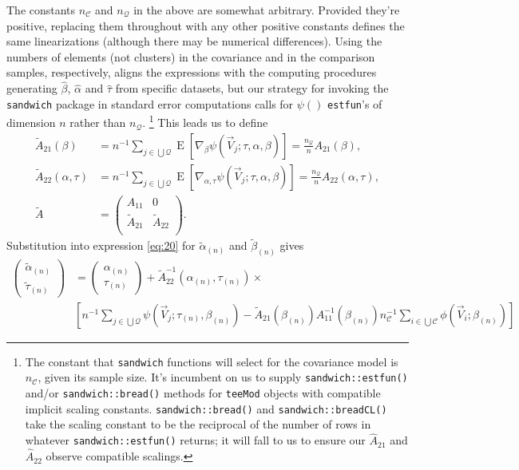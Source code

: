 \documentclass{article}
\newcommand{\EE}{\operatorname{E}}
\begin{document}
The constants $n_{\mathcal{C}}$ and
$n_{\mathcal{Q}}$ in the above are somewhat
arbitrary.  Provided they're positive, replacing them throughout with any other
positive constants defines the same linearizations (although there may
be numerical differences).  
Using the numbers of elements (not
clusters) in the covariance and in the comparison samples,
respectively, aligns the expressions with the computing procedures
generating $\hat\beta$, $\hat\alpha$ and $\hat\tau$ from specific
datasets, but our strategy for invoking the \texttt{sandwich} package
in standard error computations calls for  $\psi()$ \texttt{estfun}'s
of dimension $n$ rather than $n_{\mathcal{Q}}$.%
\footnote{%
  The constant that \texttt{sandwich}
  functions will select for the covariance model is $n_{\mathcal{C}}$, given its sample
  size.  It's incumbent on us to supply \texttt{sandwich::estfun()}
  and/or \texttt{sandwich::bread()} methods for
  \texttt{teeMod} objects with compatible implicit scaling
  constants. \texttt{sandwich::bread()} and
  \texttt{sandwich::breadCL()} take the scaling constant to be the
  reciprocal of the number of rows in whatever
  \texttt{sandwich::estfun()} returns; it will fall to us to ensure
  our $\hat{A}_{21}$ and $\hat{A}_{22}$ observe compatible scalings.}%
 This leads us to
define
\begin{align*}
  \tilde{A}_{21}(\beta) &= n^{-1} \sum_{j\in \bigcup
        \mathcal{Q}}\EE[ \nabla_{\beta}\psi(\vec{V}_{j};
        \tau, \alpha, \beta )] = \frac{n_{\mathcal{Q}}}{n} {A}_{21}(\beta),\\
  \tilde{A}_{22}(\alpha, \tau) &= n^{-1} \sum_{j\in \bigcup
        \mathcal{Q}}\EE[ \nabla_{\alpha, \tau}\psi(\vec{V}_{j};
        \tau, \alpha, \beta )] = \frac{n_{\mathcal{Q}}}{n}
                                 {A}_{22}(\alpha, \tau),\\
  \tilde{A} &= \left(
              \begin{array}{cc}
                A_{11} & 0 \\
                \tilde{A}_{21} & \tilde{A}_{22}\\
              \end{array}
\right).
\end{align*}
Substitution into  expression \eqref{eq:20} for
$\tilde{\alpha}_{(n)}$ and $\tilde{\beta}_{(n)}$ gives
\begin{align}
      \left(\begin{array}{c}\tilde{\alpha}_{(n)}\\ \tilde{\tau}_{(n)} \end{array}\right)         &=\left(\begin{array}{c}\alpha_{(n)}\\
                         \tau_{(n)} \end{array}\right) +
    \tilde{A}_{22}^{-1}(\alpha_{(n)}, \tau_{(n)})\times \label{eq:21}\\
    & \left[
                 n^{-1}\sum_{j\in \bigcup
                 \mathcal{Q}}\psi(\vec{V}_{j};
                 \tau_{(n)},\beta_{(n)} ) -
      \tilde{A}_{21}(\beta_{(n)})
      {A}_{11}^{-1}(\beta_{(n)})n_{\mathcal{C}}^{-1}\sum_{i\in \bigcup
      \mathcal{C}}\phi(\vec{V}_{i}; \beta_{(n)})\right] \nonumber
\end{align}
\end{document}
